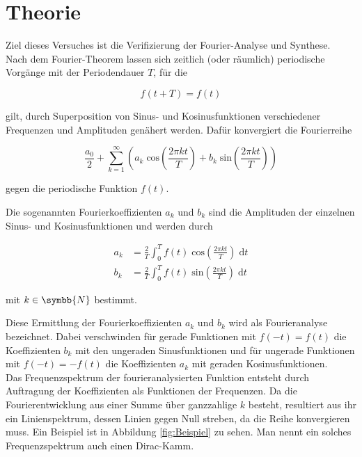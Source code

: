 \section{Theorie}
\label{sec:Theorie}

Ziel dieses Versuches ist die Verifizierung der Fourier-Analyse und Synthese. \\

Nach dem Fourier-Theorem lassen sich zeitlich (oder räumlich) periodische Vorgänge mit der Periodendauer
$T$, für die

\begin{equation}
    f(t + T) = f(t) 
\end{equation}

gilt, durch Superposition von Sinus- und Kosinusfunktionen verschiedener Frequenzen und Amplituden genähert werden.
Dafür konvergiert die Fourierreihe

\begin{equation}
    \label{eqn:Entwicklung}
    \frac{a_0}{2} + \sum^\infty_{k = 1} \left(a_k \;  \text{cos}\left(\frac{2 \pi k t}{T} \right) + b_k \; \text{sin}
    \left(\frac{2 \pi k t}{T} \right) \right)
\end{equation}

gegen die periodische Funktion $f(t)$.   

Die sogenannten Fourierkoeffizienten $a_k$ und $b_k$ sind die Amplituden der einzelnen Sinus- und Kosinusfunktionen 
 und werden durch 

\begin{align}
    \label{eqn:Koeff}
    a_k &= \frac{2}{T} \int_0^T f(t) \; \text{cos}\left(\frac{2 \pi k t}{T} \right) \; \text{d}t \\
    b_k &= \frac{2}{T} \int_0^T f(t) \; \text{sin}\left(\frac{2 \pi k t}{T} \right) \; \text{d}t
\end{align}

mit $k \in \symbb{N}$ bestimmt. 

Diese Ermittlung der Fourierkoeffizienten $a_k$ und $b_k$ wird als Fourieranalyse bezeichnet.
Dabei verschwinden für gerade Funktionen mit $f(-t) = f(t)$ die Koeffizienten $b_k$ mit den ungeraden Sinusfunktionen und für
ungerade Funktionen mit $f(-t) = -f(t)$ die Koeffizienten $a_k$ mit geraden Kosinusfunktionen. \\

Das Frequenzspektrum der fourieranalysierten Funktion entsteht durch Auftragung der Koeffizienten als Funktionen der Frequenzen.
Da die Fourierentwicklung aus einer Summe über ganzzahlige $k$ besteht, resultiert aus ihr ein Linienspektrum, dessen
Linien gegen Null streben, da die Reihe konvergieren muss. Ein Beispiel ist in 
Abbildung \ref{fig:Beispiel} zu sehen. Man nennt ein solches Frequenzspektrum
auch einen Dirac-Kamm.

